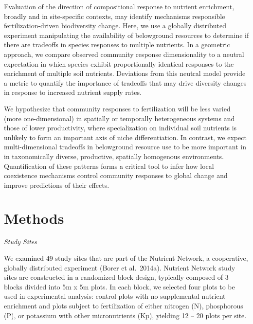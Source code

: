 \documentclass[twoside,12pt,final]{ucthesis-CA2012}
\begin{document}
\begin{ucmainmatter}
Evaluation of the direction of compositional response to nutrient enrichment, broadly and in site-specific contexts, may identify mechanisms responsible fertilization-driven biodiversity change.
Here, we use a globally distributed experiment manipulating the availability of belowground resources to determine if there are tradeoffs in species responses to multiple nutrients.
In a geometric approach, we compare observed community response dimensionality to a neutral expectation in which species exhibit proportionally identical responses to the enrichment of multiple soil nutrients.
Deviations from this neutral model provide a metric to quantify the importance of tradeoffs that may drive diversity changes in response to increased nutrient supply rates.

We hypothesize that community responses to fertilization will be less varied (more one-dimensional) in spatially or temporally heterogeneous systems and those of lower productivity, where specialization on individual soil nutrients is unlikely to form an important axis of niche differentiation. In contrast, we expect multi-dimensional tradeoffs in belowground resource use to be more important in in taxonomically diverse, productive, spatially homogenous environments. Quantification of these patterns forms a critical tool to infer how local coexistence mechanisms control community responses to global change and improve predictions of their effects.

\hypertarget{methods}{%
\section{Methods}\label{methods}}

\emph{Study Sites}

We examined 49 study sites that are part of the Nutrient Network, a cooperative, globally distributed experiment (Borer et al.~2014a). Nutrient Network study sites are constructed in a randomized block design, typically composed of 3 blocks divided into 5m x 5m plots. In each block, we selected four plots to be used in experimental analysis: control plots with no supplemental nutrient enrichment and plots subject to fertilization of either nitrogen (N), phosphorous (P), or potassium with other micronutrients (Kµ), yielding 12 -- 20 plots per site.


\end{ucmainmatter}
\end{document}
